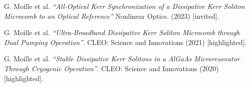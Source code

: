 \documentclass[11pt, a4paper]{customcv}
\begin{document}
{{\begin{cvlist}
        \item G. Moille et al. \textit{``All-Optical Kerr Synchronization of a Dissipative Kerr Soliton Microcomb to an Optical Reference''}  Nonlinear Optics. (2023) {[invited]}.
        \item G. Moille et al. \textit{``Ultra-Broadband Dissipative Kerr Soliton Microcomb through Dual Pumping Operation''}. CLEO: Science and Innovations (2021) {[highlighted]}.
        \item G. Moille et al. \textit{``Stable Dissipative Kerr Solitons in a AlGaAs Microresonator Through Cryogenic Operation''}. CLEO: Science and Innovations (2020) {[highlighted]}.
    \end{cvlist}
    }
}
\end{document}

